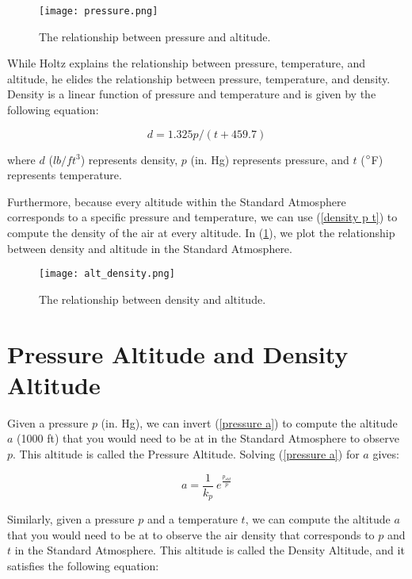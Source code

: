 \documentclass[10pt,a4paper]{article}
\begin{document}
\begin{figure}[h]
\texttt{[image: pressure.png]} 
\caption{The relationship between pressure and altitude.}
\end{figure}

While Holtz explains the relationship between pressure, temperature, and altitude, he elides the relationship between pressure, temperature, and density. Density is a linear function of pressure and temperature and is given by the following equation:

\begin{equation}
\label{density p t}
d = 1.325 p / (t + 459.7)
\end{equation}

where $d$ ($lb/ft^3$) represents density, $p$ (in. Hg) represents pressure, and $t$ ($\degree $F) represents temperature.

Furthermore, because every altitude within the Standard Atmosphere corresponds to a specific pressure and temperature, we can use (\ref{density p t}) to compute the density of the air at every altitude. In (\ref{plot density}), we plot the relationship between density and altitude in the Standard Atmosphere.

\begin{figure}[H]
\texttt{[image: alt\_density.png]}
\caption{The relationship between density and altitude.}
\label{plot density}
\end{figure}

\section{Pressure Altitude and Density Altitude}

Given a pressure $p$ (in. Hg), we can invert (\ref{pressure a}) to compute the altitude $a$ (1000 ft) that you would need to be at in the Standard Atmosphere to observe $p$. This altitude is called the Pressure Altitude. Solving (\ref{pressure a}) for $a$ gives:

\begin{equation}
\label{alt p}
a = \frac{1}{k_{p}}\ e^{\frac{p_{std}}{p}}
\end{equation}

Similarly, given a pressure $p$ and a temperature $t$, we can compute the altitude $a$ that you would need to be at to observe the air density that corresponds to $p$ and $t$ in the Standard Atmosphere. This altitude is called the Density Altitude, and it satisfies the following equation:
\end{document}
